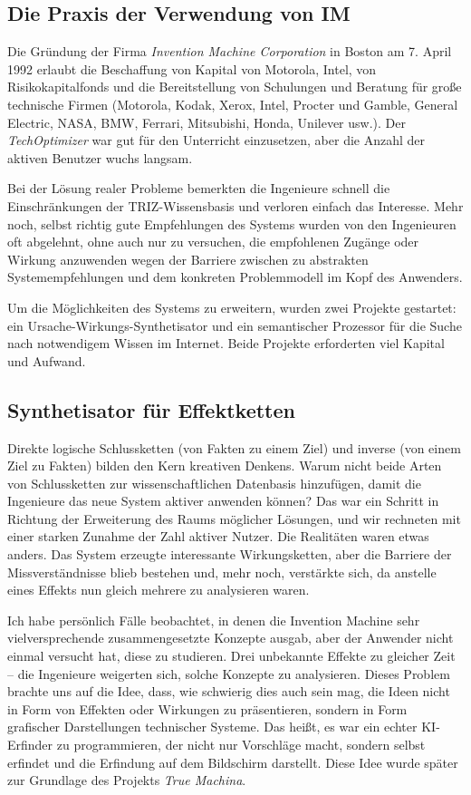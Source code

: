 \documentclass[11pt,a4paper]{article}
\begin{document}
\subsection{Die Praxis der Verwendung von IM}

Die Gründung der Firma \emph{Invention Machine Corporation} in Boston am
7. April 1992 erlaubt die Beschaffung von Kapital von Motorola, Intel, von
Risikokapitalfonds und die Bereitstellung von Schulungen und Beratung für
große technische Firmen (Motorola, Kodak, Xerox, Intel, Procter und Gamble,
General Electric, NASA, BMW, Ferrari, Mitsubishi, Honda, Unilever usw.).  Der
\emph{TechOptimizer} war gut für den Unterricht einzusetzen, aber die Anzahl
der aktiven Benutzer wuchs langsam.

Bei der Lösung realer Probleme bemerkten die Ingenieure schnell die
Einschränkungen der TRIZ-Wissensbasis und verloren einfach das Interesse.
Mehr noch, selbst richtig gute Empfehlungen des Systems wurden von den
Ingenieuren oft abgelehnt, ohne auch nur zu versuchen, die empfohlenen Zugänge
oder Wirkung anzuwenden wegen der Barriere zwischen zu abstrakten
Systemempfehlungen und dem konkreten Problemmodell im Kopf des Anwenders.

Um die Möglichkeiten des Systems zu erweitern, wurden zwei Projekte gestartet:
ein Ursache-Wirkungs-Synthetisator und ein semantischer Prozessor für die
Suche nach notwendigem Wissen im Internet. Beide Projekte erforderten viel
Kapital und Aufwand.

\subsection{Synthetisator für Effektketten}

Direkte logische Schlussketten (von Fakten zu einem Ziel) und inverse (von
einem Ziel zu Fakten) bilden den Kern kreativen Denkens. Warum nicht beide
Arten von Schlussketten zur wissenschaftlichen Datenbasis hinzufügen, damit
die Ingenieure das neue System aktiver anwenden können? Das war ein Schritt in
Richtung der Erweiterung des Raums möglicher Lösungen, und wir rechneten mit
einer starken Zunahme der Zahl aktiver Nutzer. Die Realitäten waren etwas
anders.  Das System erzeugte interessante Wirkungsketten, aber die Barriere
der Missverständnisse blieb bestehen und, mehr noch, verstärkte sich, da
anstelle eines Effekts nun gleich mehrere zu analysieren waren. 

Ich habe persönlich Fälle beobachtet, in denen die Invention Machine sehr
vielversprechende zusammengesetzte Konzepte ausgab, aber der Anwender nicht
einmal versucht hat, diese zu studieren. Drei unbekannte Effekte zu gleicher
Zeit -- die Ingenieure weigerten sich, solche Konzepte zu analysieren.  Dieses
Problem brachte uns auf die Idee, dass, wie schwierig dies auch sein mag, die
Ideen nicht in Form von Effekten oder Wirkungen zu präsentieren, sondern in
Form grafischer Darstellungen technischer Systeme. Das heißt, es war ein
echter KI-Erfinder zu programmieren, der nicht nur Vorschläge macht, sondern
selbst erfindet und die Erfindung auf dem Bildschirm darstellt. Diese Idee
wurde später zur Grundlage des Projekts \emph{True Machina}.
\end{document}
